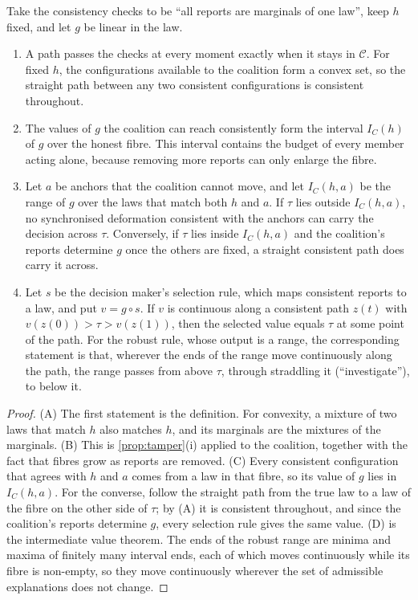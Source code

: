 \documentclass[11pt]{article}
\theoremstyle{definition}\newtheorem{definition}[theorem]{Definition}\newtheorem{remark}[theorem]{Remark}\newtheorem{example}[theorem]{Example}\newtheorem{problem}[theorem]{Open problem}\crefname{problem}{Problem}{Problems}
\begin{document}
\begin{proposition}\label{prop:miscal}
Take the consistency checks to be ``all reports are marginals of one law'', keep $h$ fixed, and let $g$ be linear in the law.
\begin{enumerate}
\item[(A)] A path passes the checks at every moment exactly when it stays in $\mathcal C$. For fixed $h$, the configurations available to the coalition form a convex set, so the straight path between any two consistent configurations is consistent throughout.
\item[(B)] The values of $g$ the coalition can reach consistently form the interval $I_C(h)$ of $g$ over the honest fibre. This interval contains the budget of every member acting alone, because removing more reports can only enlarge the fibre.
\item[(C)] Let $a$ be anchors that the coalition cannot move, and let $I_C(h,a)$ be the range of $g$ over the laws that match both $h$ and $a$. If $\tau$ lies outside $I_C(h,a)$, no synchronised deformation consistent with the anchors can carry the decision across $\tau$. Conversely, if $\tau$ lies inside $I_C(h,a)$ and the coalition's reports determine $g$ once the others are fixed, a straight consistent path does carry it across.
\item[(D)] Let $s$ be the decision maker's selection rule, which maps consistent reports to a law, and put $v=g\circ s$. If $v$ is continuous along a consistent path $z(t)$ with $v(z(0))>\tau>v(z(1))$, then the selected value equals $\tau$ at some point of the path. For the robust rule, whose output is a range, the corresponding statement is that, wherever the ends of the range move continuously along the path, the range passes from above $\tau$, through straddling it (``investigate''), to below it.
\end{enumerate}
\end{proposition}

\begin{proof}
(A) The first statement is the definition. For convexity, a mixture of two laws that match $h$ also matches $h$, and its marginals are the mixtures of the marginals. (B) This is \cref{prop:tamper}(i) applied to the coalition, together with the fact that fibres grow as reports are removed. (C) Every consistent configuration that agrees with $h$ and $a$ comes from a law in that fibre, so its value of $g$ lies in $I_C(h,a)$. For the converse, follow the straight path from the true law to a law of the fibre on the other side of $\tau$; by (A) it is consistent throughout, and since the coalition's reports determine $g$, every selection rule gives the same value. (D) is the intermediate value theorem. The ends of the robust range are minima and maxima of finitely many interval ends, each of which moves continuously while its fibre is non-empty, so they move continuously wherever the set of admissible explanations does not change.
\end{proof}
\end{document}
